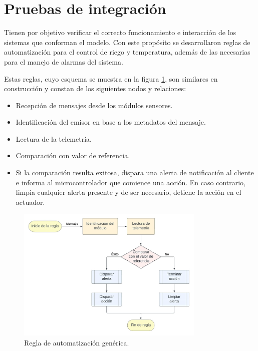 \section{Pruebas de integración}
\label{sec:Pruebas de sistema}

Tienen por objetivo verificar el correcto funcionamiento e interacción de los sistemas que conforman el modelo. Con este propósito se desarrollaron reglas de automatización para el control de riego y temperatura, además de las necesarias para el manejo de alarmas del sistema. 

Estas reglas, cuyo esquema se muestra en la figura \ref{fig:basic_rule}, son similares en construcción y constan de los siguientes nodos y relaciones:

\begin{itemize}
\item Recepción de mensajes desde los módulos sensores.
\item Identificación del emisor en base a los metadatos del mensaje.
\item Lectura de la telemetría.
\item Comparación con valor de referencia.
\item[] Si la comparación resulta exitosa, dispara una alerta de notificación al cliente e informa al microcontrolador que comience una acción. En caso contrario, limpia cualquier alerta presente y de ser necesario, detiene la acción en el actuador.
\end{itemize}





\begin{figure}[h]
	\centering
	\includegraphics[width=0.8\textwidth]{./Figures/chapter4/ReglaBasica.jpg}
	\caption[Regla de automatización genérica]{Regla de automatización genérica.}
	\label{fig:basic_rule}
\end{figure}

